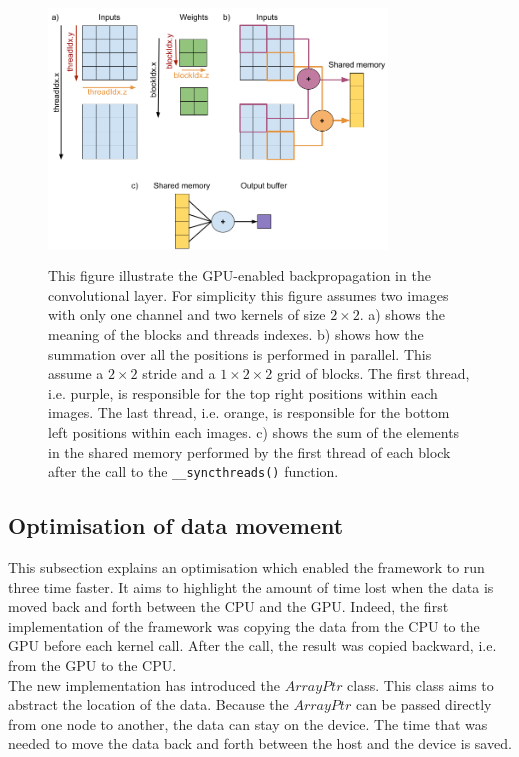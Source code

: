 \documentclass[11pt]{report}
\begin{document}
\begin{figure}[h]
\centering
\includegraphics[width=9cm, height=7cm]{conv2d_backpropagation}
\caption[Illustration of the GPU-enabled backpropagation in convolutional layer]{This figure illustrate the GPU-enabled backpropagation in the convolutional layer. For simplicity this figure assumes two images with only one channel and two kernels of size $2\times2$. a) shows the meaning of the blocks and threads indexes. b) shows how the summation over all the positions is performed in parallel. This assume a $2\times2$ stride and a $1\times2\times2$ grid of blocks. The first thread, i.e. purple, is responsible for the top right positions within each images. The last thread, i.e. orange, is responsible for the bottom left positions within each images. c) shows the sum of the elements in the shared memory performed by the first thread of each block after the call to the \texttt{__syncthreads()} function.}
\label{fig:conv2d_backpropagation}
\end{figure}

\subsection{Optimisation of data movement} \label{opti_data_move}

This subsection explains an optimisation which enabled the framework to run three time faster. It aims to highlight the amount of time lost when the data is moved back and forth between the CPU and the GPU. Indeed, the first implementation of the framework was copying the data from the CPU to the GPU before each kernel call. After the call, the result was copied backward, i.e. from the GPU to the CPU.
\\

\noindent The new implementation has introduced the $ArrayPtr$ class. This class aims to abstract the location of the data. Because the $ArrayPtr$ can be passed directly from one node to another, the data can stay on the device. The time that was needed to move the data back and forth between the host and the device is saved.
\end{document}
